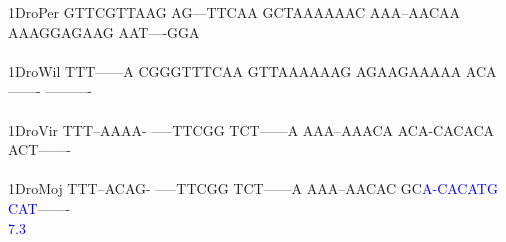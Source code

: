 \documentclass[11pt,twoside,reqno,a4paper]{article}
\begin{document}
{1\hspace*{3\charwidth}DroPer	GTTCGTTAAG	AG---TTCAA	GCTAAAAAAC	AAA--AACAA	AAAGGAGAAG	AAT----GGA	\\
\hspace*{4\charwidth}\hspace*{7\charwidth}\hspace*{1\charwidth}\hspace*{1\charwidth}\hspace*{1\charwidth}\hspace*{1\charwidth}\hspace*{1\charwidth}\hspace*{1\charwidth}\\
1\hspace*{3\charwidth}DroWil	TTT------A	CGGGTTTCAA	GTTAAAAAAG	AGAAGAAAAA	ACA-------	----------	\\
\hspace*{4\charwidth}\hspace*{7\charwidth}\hspace*{1\charwidth}\hspace*{1\charwidth}\hspace*{1\charwidth}\hspace*{1\charwidth}\hspace*{1\charwidth}\hspace*{1\charwidth}\\
1\hspace*{3\charwidth}DroVir	TTT--AAAA-	-----TTCGG	TCT------A	AAA--AAACA	ACA-CACACA	ACT-------	\\
\hspace*{4\charwidth}\hspace*{7\charwidth}\hspace*{1\charwidth}\hspace*{1\charwidth}\hspace*{1\charwidth}\hspace*{1\charwidth}\hspace*{1\charwidth}\hspace*{1\charwidth}\\
1\hspace*{3\charwidth}DroMoj	TTT--ACAG-	-----TTCGG	TCT------A	AAA--AACAC	GC\textcolor{blue}{A}\textcolor{blue}{-}\textcolor{blue}{C}\textcolor{blue}{A}\textcolor{blue}{C}\textcolor{blue}{A}\textcolor{blue}{T}\textcolor{blue}{G}	\textcolor{blue}{C}\textcolor{blue}{A}\textcolor{blue}{T}-------	\\
\hspace*{4\charwidth}\hspace*{7\charwidth}\hspace*{1\charwidth}\hspace*{1\charwidth}\hspace*{1\charwidth}\hspace*{1\charwidth}\hspace*{42\charwidth}\textcolor{blue}{7.3}\hspace*{1\charwidth}\hspace*{1\charwidth}\\
}
\end{document}
